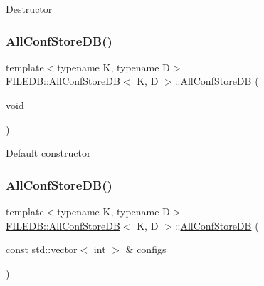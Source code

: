 Destructor \mbox{\label{classFILEDB_1_1AllConfStoreDB_a72b72501b29029e2bfb682565f96eac0}} 
\subsubsection{\texorpdfstring{AllConfStoreDB()}{AllConfStoreDB()}\hspace{0.1cm}{\footnotesize\ttfamily [4/6]}}
{\footnotesize\ttfamily template$<$typename K, typename D$>$ \\
\mbox{\hyperlink{classFILEDB_1_1AllConfStoreDB}{F\+I\+L\+E\+D\+B\+::\+All\+Conf\+Store\+DB}}$<$ K, D $>$\+::\mbox{\hyperlink{classFILEDB_1_1AllConfStoreDB}{All\+Conf\+Store\+DB}} (\begin{DoxyParamCaption}\item[{void}]{ }\end{DoxyParamCaption})\hspace{0.3cm}{\ttfamily [inline]}}

Default constructor \mbox{\label{classFILEDB_1_1AllConfStoreDB_a9a8553b0ce3ac82be098130d08f62162}} 
\subsubsection{\texorpdfstring{AllConfStoreDB()}{AllConfStoreDB()}\hspace{0.1cm}{\footnotesize\ttfamily [5/6]}}
{\footnotesize\ttfamily template$<$typename K, typename D$>$ \\
\mbox{\hyperlink{classFILEDB_1_1AllConfStoreDB}{F\+I\+L\+E\+D\+B\+::\+All\+Conf\+Store\+DB}}$<$ K, D $>$\+::\mbox{\hyperlink{classFILEDB_1_1AllConfStoreDB}{All\+Conf\+Store\+DB}} (\begin{DoxyParamCaption}\item[{const std\+::vector$<$ int $>$ \&}]{configs }\end{DoxyParamCaption})\hspace{0.3cm}{\ttfamily [inline]}}

